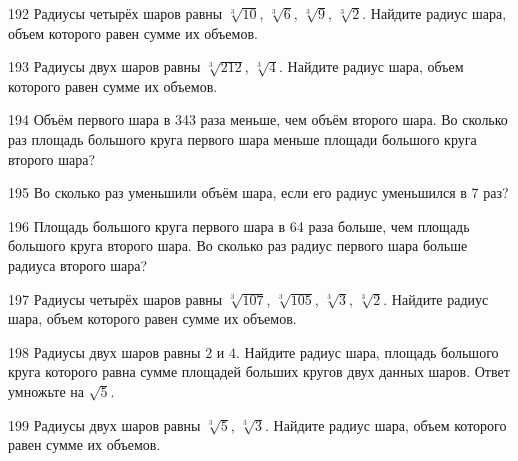 \documentclass[a4paper]{article}
\begin{document}
\begin{taskBN}{192}
Радиусы четырёх шаров равны $\sqrt[3]{10}$, $\sqrt[3]{6}$, $\sqrt[3]{9}$, $\sqrt[3]{2}$. Найдите радиус шара, объем которого равен сумме их объемов.
\end{taskBN}

\begin{taskBN}{193}
Радиусы двух шаров равны $\sqrt[3]{212}$, $\sqrt[3]{4}$. Найдите радиус шара, объем которого равен сумме их объемов.
\end{taskBN}

\begin{taskBN}{194}
Объём первого шара в 343 раза меньше, чем объём второго шара. Во сколько раз площадь большого круга первого шара меньше площади большого круга второго шара?
\end{taskBN}

\begin{taskBN}{195}
Во сколько раз уменьшили объём шара, если его радиус уменьшился в 7 раз?
\end{taskBN}

\begin{taskBN}{196}
Площадь большого круга первого шара в 64 раза больше, чем площадь большого круга второго шара. Во сколько раз радиус первого шара больше радиуса второго шара?
\end{taskBN}

\begin{taskBN}{197}
Радиусы четырёх шаров равны $\sqrt[3]{107}$, $\sqrt[3]{105}$, $\sqrt[3]{3}$, $\sqrt[3]{2}$. Найдите радиус шара, объем которого равен сумме их объемов.
\end{taskBN}

\begin{taskBN}{198}
Радиусы двух шаров равны $2$ и $4$. Найдите радиус шара, площадь большого круга которого равна сумме площадей больших кругов двух данных шаров. Ответ умножьте на $\sqrt{5}$.
\end{taskBN}

\begin{taskBN}{199}
Радиусы двух шаров равны $\sqrt[3]{5}$, $\sqrt[3]{3}$. Найдите радиус шара, объем которого равен сумме их объемов.
\end{taskBN}
\end{document}
